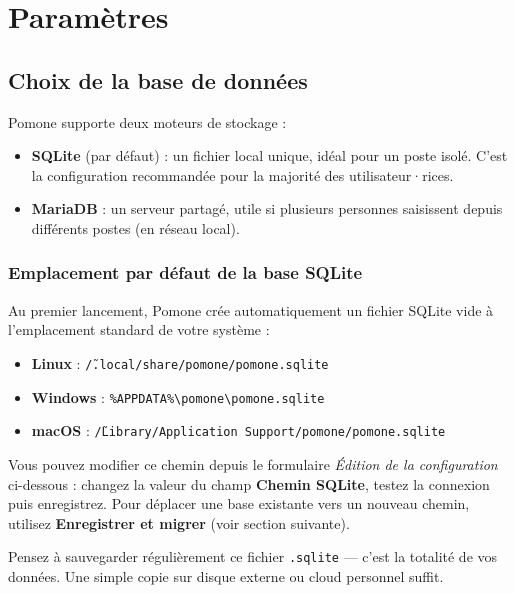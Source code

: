 \chapter{Paramètres}
\label{chap:parametres}

\section{Choix de la base de données}

Pomone supporte deux moteurs de stockage :

\begin{itemize}
  \item \textbf{SQLite} (par défaut) : un fichier local unique, idéal pour un poste isolé. C'est la configuration recommandée pour la majorité des utilisateur·rices.
  \item \textbf{MariaDB} : un serveur partagé, utile si plusieurs personnes saisissent depuis différents postes (en réseau local).
\end{itemize}

\subsection{Emplacement par défaut de la base SQLite}

Au premier lancement, Pomone crée automatiquement un fichier SQLite vide à l'emplacement standard de votre système :

\begin{itemize}
  \item \textbf{Linux} : \texttt{\~/.local/share/pomone/pomone.sqlite}
  \item \textbf{Windows} : \texttt{\%APPDATA\%\textbackslash pomone\textbackslash pomone.sqlite}
  \item \textbf{macOS} : \texttt{\~/Library/Application Support/pomone/pomone.sqlite}
\end{itemize}

Vous pouvez modifier ce chemin depuis le formulaire \emph{Édition de la configuration} ci-dessous : changez la valeur du champ \textbf{Chemin SQLite}, testez la connexion puis enregistrez. Pour déplacer une base existante vers un nouveau chemin, utilisez \textbf{Enregistrer et migrer} (voir section suivante).

\begin{notebox}
Pensez à sauvegarder régulièrement ce fichier \texttt{.sqlite} — c'est la totalité de vos données. Une simple copie sur disque externe ou cloud personnel suffit.
\end{notebox}

